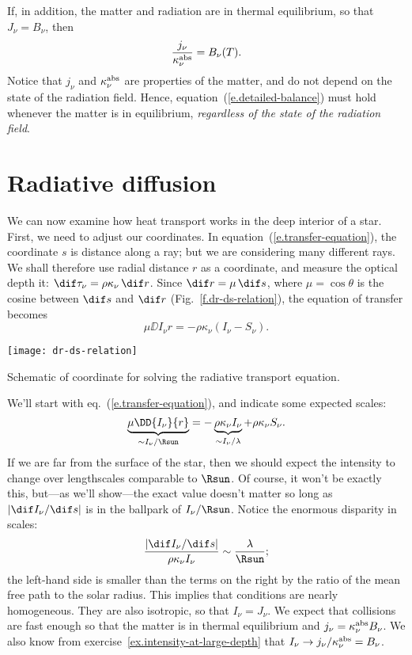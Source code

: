 If, in addition, the matter and radiation are in thermal equilibrium, so that $J_{\nu} = B_{\nu}$, then
\begin{equation}\label{e.detailed-balance}
\frac{j_{\nu}}{\kappa_\nu^{\mathrm{abs}}} = B_{\nu}(T).
\end{equation}
Notice that $j_{\nu}$ and $\kappa_\nu^{\mathrm{abs}}$ are properties of the matter, and do not depend on the state of the radiation field. Hence, equation~(\ref{e.detailed-balance}) must hold whenever the matter is in equilibrium, \emph{regardless of the state of the radiation field}.

\section{Radiative diffusion}

We can now examine how heat transport works in the deep interior of a star. First, we need to adjust our coordinates. In equation~(\ref{e.transfer-equation}), the coordinate $s$ is distance along a ray; but we are considering many different rays. We shall therefore use radial distance $r$ as a coordinate, and measure the optical depth it: $\dif\tau_{\nu} = \rho\kappa_{\nu}\,\dif r$. 
Since $\dif r = \mu\,\dif s$, where $\mu=\cos\theta$ is the cosine between $\dif s$ and $\dif r$ (Fig.~\ref{f.dr-ds-relation}), the equation of transfer becomes
\begin{equation}
\mu\DD{I_{\nu}}{r} = -\rho\kappa_{\nu}\left(I_{\nu} - S_{\nu}\right).
\end{equation}
\begin{marginfigure}
\texttt{[image: dr-ds-relation]}
\caption{\label{f.dr-ds-relation} Schematic of coordinate for solving the radiative transport equation.}
\end{marginfigure}

 We'll start with eq.~(\ref{e.transfer-equation}), and indicate some expected scales:
\[
\underbrace{\mu\DD{I_{\nu}}{r}}_{\sim I_{\nu}/\Rsun} = -\underbrace{\rho\kappa_{\nu} I_{\nu}}_{\sim I_{\nu}/\lambda}  +\rho\kappa_{\nu} S_{\nu}.
\]
If we are far from the surface of the star, then we should expect the intensity to change over lengthscales comparable to $\Rsun$. Of course, it won't be exactly this, but---as we'll show---the exact value doesn't matter so long as $|\dif I_{\nu}/\dif s|$ is in the ballpark of $I_{\nu}/\Rsun$. Notice the enormous disparity in scales:
\[
	\frac{|\dif I_{\nu}/\dif s|}{\rho\kappa_{\nu}I_{\nu}} \sim \frac{\lambda}{\Rsun};
\]
the left-hand side is smaller than the terms on the right by the ratio of the mean free path to the solar radius. This implies that conditions are nearly homogeneous. They are also isotropic, so that $I_{\nu} = J_{\nu}$. We expect that collisions are fast enough so that the matter is in thermal equilibrium and $j_{\nu} = \kappa_\nu^{\mathrm{abs}} B_{\nu}$. We also know from exercise~\ref{ex.intensity-at-large-depth} that $I_{\nu} \to j_{\nu}/\kappa_\nu^{\mathrm{abs}} = B_{\nu}$.

